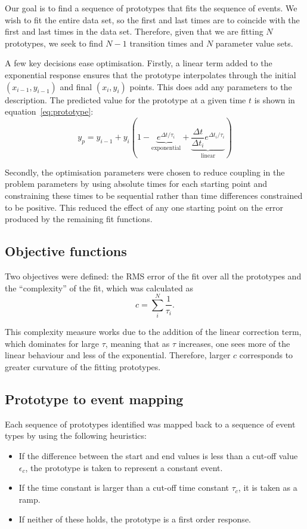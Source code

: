 Our goal is to find a sequence of prototypes that fits the sequence of
events.  We wish to fit the entire data set, so the first and last
times are to coincide with the first and last times in the data set.
Therefore, given that we are fitting $N$ prototypes, we seek to find
$N-1$ transition times and $N$ parameter value sets.

A few key decisions ease optimisation.  Firstly, a linear term 
added to the exponential response ensures that the prototype
interpolates through the initial $(x_{i-1}, y_{i-1})$ and final
$(x_{i}, y_{i})$ points.  This does add any parameters to the
description.  The predicted value for the prototype at a given time
$t$ is shown in equation~\ref{eq:prototype}:
\begin{equation}
  \label{eq:prototype}
  y_p = y_{i-1} + y_i \left (1 - \underbrace{e^{\Delta
        t/\tau_i}}_{\textrm{exponential}} + \underbrace{\frac{\Delta
        t}{\Delta t_i}e^{\Delta t_i/\tau_i}}_{\textrm{linear}} \right)
\end{equation}

Secondly, the optimisation parameters were chosen to reduce coupling
in the problem parameters by using absolute times for each starting
point and constraining these times to be sequential rather than time
differences constrained to be positive.  This reduced the effect of
any one starting point on the error produced by the remaining fit
functions.

\subsection{Objective functions}
Two objectives were defined: the RMS error of the fit over all the
prototypes and the ``complexity'' of the fit, which was calculated as
\begin{equation}
  c = \sum_i^{N} \frac{1}{\tau_i}.
\end{equation}

This complexity measure works due to the addition of the linear
correction term, which dominates for large $\tau$, meaning that as
$\tau$ increases, one sees more of the linear behaviour and less of
the exponential.  Therefore, larger $c$ corresponds to greater
curvature of the fitting prototypes.

\subsection{Prototype to event mapping}
Each sequence of prototypes identified was mapped back to a sequence
of event types by using the following heuristics:
\begin{itemize}
\item If the difference between the start and end values is less
  than a cut-off value $\epsilon_c$, the prototype is taken to
  represent a constant event.
\item If the time constant is larger than a cut-off time constant
  $\tau_c$, it is taken as a ramp.
\item If neither of these holds, the prototype is a first order response.
\end{itemize}

